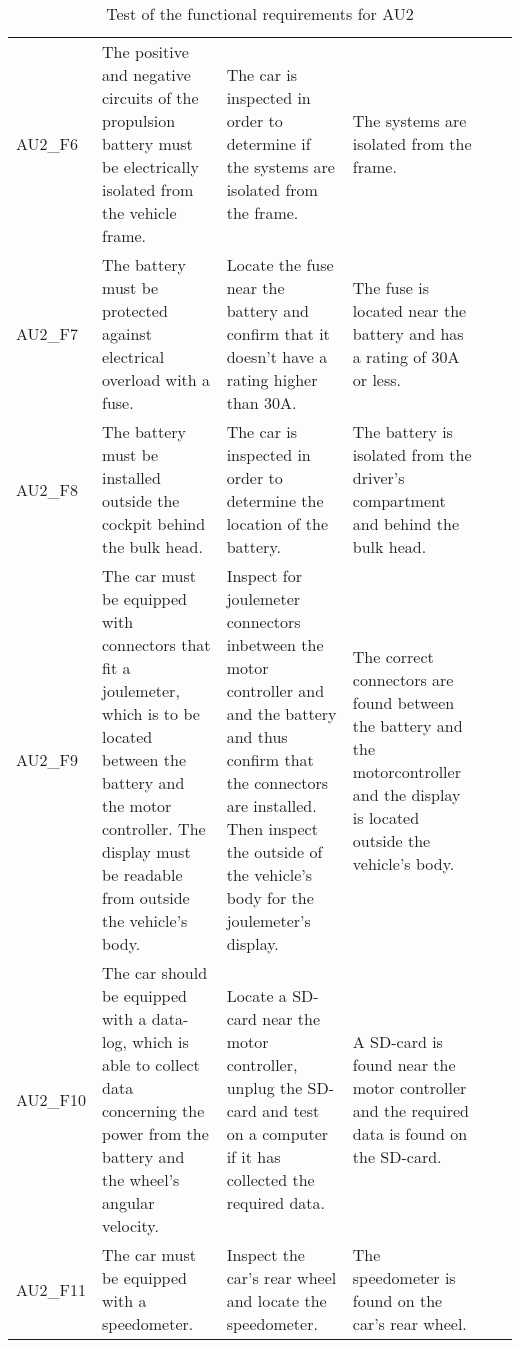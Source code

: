 \begin{table}[h!]
\begin{tabular}{|p{1.6 cm}|p{2.9 cm}|p{2.1 cm}|p{2.1 cm}|p{2.1 cm}|p{1.9 cm}|}
		& \\ \hline
		AU2\_F6 
		& The positive and negative circuits of the propulsion battery  must be electrically isolated from the vehicle frame.
		& The car is inspected in order to determine if the systems are isolated from the frame.
		& The systems are isolated from the frame.
		& 
		& \\ \hline
		AU2\_F7 
		& The battery must be protected against electrical overload with a fuse.
		& Locate the fuse near the battery and confirm that it doesn't have a rating higher than 30A. 
		& The fuse is located near the battery and has a rating of 30A or less. 
		& 
		& \\ \hline
		AU2\_F8 
		& The battery must be installed outside the cockpit behind the bulk head.
		& The car is inspected in order to determine the location of the battery.
		& The battery is isolated from the driver's compartment and behind the bulk head. 
		& 
		& \\ \hline
		AU2\_F9 
		& The car must be equipped with connectors that fit a joulemeter, which is to be located between the battery and the motor controller. The display must be readable from outside the vehicle's body.
		& Inspect for joulemeter connectors inbetween the motor controller and and the battery and thus confirm that the connectors are installed. Then inspect the outside of the vehicle's body for the joulemeter's display.
		& The correct connectors are found between the battery and the motorcontroller and the display is located outside the vehicle's body.
		& 
		& \\ \hline
		AU2\_F10 
		& The car should be equipped with a data-log, which is able to collect data concerning the power from the battery and the wheel's angular velocity.
		& Locate a SD-card near the motor controller, unplug the SD-card and test on a computer if it has collected the required data.  
		& A SD-card is found near the motor controller and the required data is found on the SD-card.
		& 
		& \\ \hline
		AU2\_F11 
		& The car must be equipped with a speedometer.
		& Inspect the car's rear wheel and locate the speedometer.
		& The speedometer is found on the car's rear wheel. 
		& 
		& \\ \hline				
	\end{tabular}
	\caption{Test of the functional requirements for AU2}
\end{table}